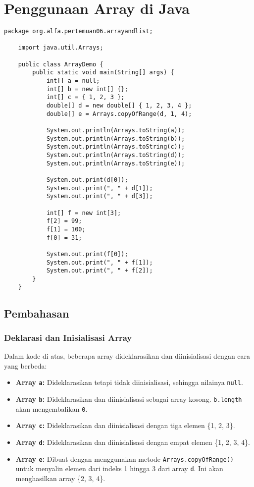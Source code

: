 \section{Penggunaan Array di Java}

\begin{lstlisting}[style=JavaStyle]
	package org.alfa.pertemuan06.arrayandlist;
	
	import java.util.Arrays;
	
	public class ArrayDemo {
		public static void main(String[] args) {
			int[] a = null;
			int[] b = new int[] {};
			int[] c = { 1, 2, 3 };
			double[] d = new double[] { 1, 2, 3, 4 };
			double[] e = Arrays.copyOfRange(d, 1, 4);
			
			System.out.println(Arrays.toString(a));
			System.out.println(Arrays.toString(b));
			System.out.println(Arrays.toString(c));
			System.out.println(Arrays.toString(d));
			System.out.println(Arrays.toString(e));
			
			System.out.print(d[0]);
			System.out.print(", " + d[1]);
			System.out.print(", " + d[3]);
			
			int[] f = new int[3];
			f[2] = 99;
			f[1] = 100;
			f[0] = 31;
			
			System.out.print(f[0]);
			System.out.print(", " + f[1]);
			System.out.print(", " + f[2]);
		}
	}
\end{lstlisting}

\subsection{Pembahasan}

\subsubsection{Deklarasi dan Inisialisasi Array}

Dalam kode di atas, beberapa array dideklarasikan dan diinisialisasi dengan cara yang berbeda:

\begin{itemize}
	\item \textbf{Array \texttt{a}:} Dideklarasikan tetapi tidak diinisialisasi, sehingga nilainya \texttt{null}.
	\item \textbf{Array \texttt{b}:} Dideklarasikan dan diinisialisasi sebagai array kosong. \texttt{b.length} akan mengembalikan \texttt{0}.
	\item \textbf{Array \texttt{c}:} Dideklarasikan dan diinisialisasi dengan tiga elemen \{1, 2, 3\}.
	\item \textbf{Array \texttt{d}:} Dideklarasikan dan diinisialisasi dengan empat elemen \{1, 2, 3, 4\}.
	\item \textbf{Array \texttt{e}:} Dibuat dengan menggunakan metode \texttt{Arrays.copyOfRange()} untuk menyalin elemen dari indeks 1 hingga 3 dari array \texttt{d}. Ini akan menghasilkan array \{2, 3, 4\}.
\end{itemize}

